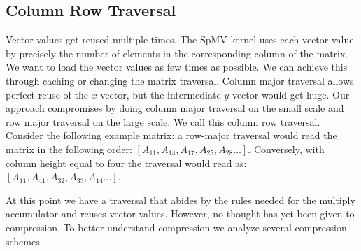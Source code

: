 \subsection{Column Row Traversal}
Vector values get reused multiple times. The SpMV kernel uses each vector value by precisely the number of elements in the corresponding column of the matrix. We want to load the vector values as few times as possible. We can achieve this through caching or changing the matrix traversal. Column major traversal allows perfect reuse of the $x$ vector, but the intermediate $y$ vector would get huge. Our approach compromises by doing column major traversal on the small scale and row major traversal on the large scale. We call this column row traversal. Consider the following example matrix: a row-major traversal would read the matrix in the following order: $[A_{11}, A_{14}, A_{17}, A_{25}, A_{28} \dots]$. Conversely, with column height equal to four the traversal would read as: $[A_{11}, A_{41}, A_{32}, A_{33}, A_{14} \dots]$. 
\par At this point we have a traversal that abides by the rules needed for the multiply accumulator and reuses vector values. However, no thought has yet been given to compression. To better understand compression we analyze several compression schemes.
\indent
